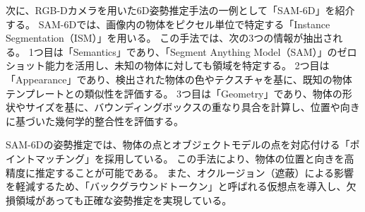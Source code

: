 次に、RGB-Dカメラを用いた6D姿勢推定手法の一例として「SAM-6D」を紹介する。
SAM-6Dでは、画像内の物体をピクセル単位で特定する「Instance Segmentation（ISM）」を用いる。
この手法では、次の3つの情報が抽出される。
1つ目は「Semantics」であり、「Segment Anything Model（SAM）」のゼロショット能力を活用し、未知の物体に対しても領域を特定する。
2つ目は「Appearance」であり、検出された物体の色やテクスチャを基に、既知の物体テンプレートとの類似性を評価する。
3つ目は「Geometry」であり、物体の形状やサイズを基に、バウンディングボックスの重なり具合を計算し、位置や向きに基づいた幾何学的整合性を評価する。

SAM-6Dの姿勢推定では、物体の点とオブジェクトモデルの点を対応付ける「ポイントマッチング」を採用している。
この手法により、物体の位置と向きを高精度に推定することが可能である。
また、オクルージョン（遮蔽）による影響を軽減するため、「バックグラウンドトークン」と呼ばれる仮想点を導入し、欠損領域があっても正確な姿勢推定を実現している。



